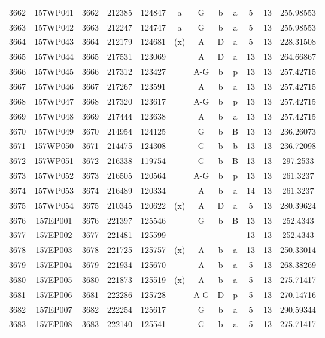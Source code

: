\begin{tabular}{|*{12}{c|}}
3662 & 157WP041 & 3662 & 212385 & 124847 & a & G & b & a & 5 & 13 & 255.98553 \\ 
3663 & 157WP042 & 3663 & 212247 & 124747 & a & G & b & a & 5 & 13 & 255.98553 \\ 
3664 & 157WP043 & 3664 & 212179 & 124681 & (x) & A & D & a & 5 & 13 & 228.31508 \\ 
3665 & 157WP044 & 3665 & 217531 & 123069 &  & A & D & a & 13 & 13 & 264.66867 \\ 
3666 & 157WP045 & 3666 & 217312 & 123427 &  & A-G & b & p & 13 & 13 & 257.42715 \\ 
3667 & 157WP046 & 3667 & 217267 & 123591 &  & A & b & a & 13 & 13 & 257.42715 \\ 
3668 & 157WP047 & 3668 & 217320 & 123617 &  & A-G & b & p & 13 & 13 & 257.42715 \\ 
3669 & 157WP048 & 3669 & 217444 & 123638 &  & A & b & a & 13 & 13 & 257.42715 \\ 
3670 & 157WP049 & 3670 & 214954 & 124125 &  & G & b & B & 13 & 13 & 236.26073 \\ 
3671 & 157WP050 & 3671 & 214475 & 124308 &  & G & b & b & 13 & 13 & 236.72098 \\ 
3672 & 157WP051 & 3672 & 216338 & 119754 &  & G & b & B & 13 & 13 & 297.2533 \\ 
3673 & 157WP052 & 3673 & 216505 & 120564 &  & A-G & b & p & 13 & 13 & 261.3237 \\ 
3674 & 157WP053 & 3674 & 216489 & 120334 &  & A & b & a & 14 & 13 & 261.3237 \\ 
3675 & 157WP054 & 3675 & 210345 & 120622 & (x) & A & D & a & 5 & 13 & 280.39624 \\ 
3676 & 157EP001 & 3676 & 221397 & 125546 &  & G & b & B & 13 & 13 & 252.4343 \\ 
3677 & 157EP002 & 3677 & 221481 & 125599 &  &  &  &  & 13 & 13 & 252.4343 \\ 
3678 & 157EP003 & 3678 & 221725 & 125757 & (x) & A & b & a & 13 & 13 & 250.33014 \\ 
3679 & 157EP004 & 3679 & 221934 & 125670 &  & A & b & a & 5 & 13 & 268.38269 \\ 
3680 & 157EP005 & 3680 & 221873 & 125519 & (x) & A & b & a & 5 & 13 & 275.71417 \\ 
3681 & 157EP006 & 3681 & 222286 & 125728 &  & A-G & D & p & 5 & 13 & 270.14716 \\ 
3682 & 157EP007 & 3682 & 222254 & 125617 &  & G & b & a & 5 & 13 & 290.59344 \\ 
3683 & 157EP008 & 3683 & 222140 & 125541 &  & G & b & a & 5 & 13 & 275.71417 \\ 

\end{tabular}
